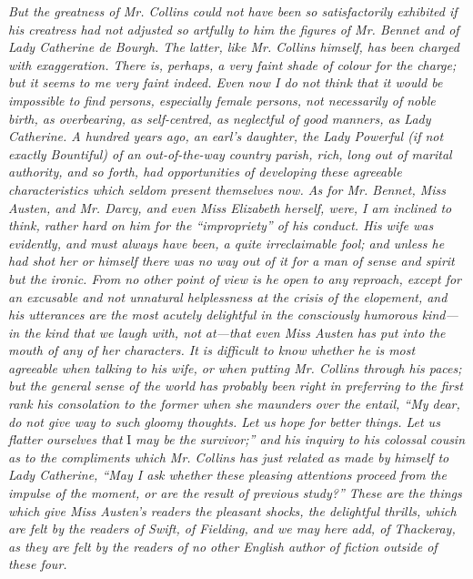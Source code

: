 \textit{But the greatness of Mr. Collins could not have been so satisfactorily exhibited if his creatress had not adjusted so artfully to him the figures of Mr. Bennet and of Lady Catherine de Bourgh. The latter, like Mr. Collins himself, has been charged with exaggeration. There is, perhaps, a very faint shade of colour for the charge; but it seems to me very faint indeed. Even now I do not think that it would be impossible to find persons, especially female persons, not necessarily of noble birth, as overbearing, as self-centred, as neglectful of good manners, as Lady Catherine. A hundred years ago, an earl's daughter, the Lady Powerful (if not exactly Bountiful) of an out-of-the-way country parish, rich, long out of marital authority, and so forth, had opportunities of developing these agreeable characteristics which seldom present themselves now. As for Mr. Bennet, Miss Austen, and Mr. Darcy, and even Miss Elizabeth herself, were, I am inclined to think, rather hard on him for the ``impropriety'' of his conduct. His wife was evidently, and must always have been, a quite irreclaimable fool; and unless he had shot her or himself there was no way out of it for a man of sense and spirit but the ironic. From no other point of view is he open to any reproach, except for an excusable and not unnatural helplessness at the crisis of the elopement, and his utterances are the most acutely delightful in the consciously humorous kind---in the kind that we laugh with, not at---that even Miss Austen has put into the mouth of any of her characters. It is difficult to know whether he is most agreeable when talking to his wife, or when putting Mr. Collins through his paces; but the general sense of the world has probably been right in preferring to the first rank his consolation to the former when she maunders over the entail, ``My dear, do not give way to such gloomy thoughts. Let us hope for better things. Let us flatter ourselves that} I \textit{may be the survivor;'' and his inquiry to his colossal cousin as to the compliments which Mr. Collins has just related as made by himself to Lady Catherine, ``May I ask whether these pleasing attentions proceed from the impulse of the moment, or are the result of previous study?'' These are the things which give Miss Austen's readers the pleasant shocks, the delightful thrills, which are felt by the readers of Swift, of Fielding, and we may here add, of Thackeray, as they are felt by the readers of no other English author of fiction outside of these four.}

